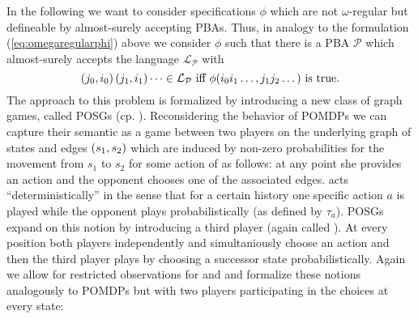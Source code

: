 In the following we want to consider specifications $\phi$ which are not 
$\omega$-regular but defineable by almost-surely accepting \acp{PBA}. Thus, in
analogy to the formulation (\ref{eq:omegaregularphi}) above we consider $\phi$ 
such that there is a \ac{PBA} $\mathcal{P}$ which almost-surely accepts the 
language $\mathcal{L}_{\mathcal{P}}$ with
\begin{equation}
  \left(j_{0}, i_{0}\right)\left(j_{1}, i_{1}\right)\dots\in\mathcal{L}_{\mathcal{P}}
  \text{ iff }
  \phi(i_{0}i_{1}\dots, j_{1}j_{2}\dots)\text{ is true.}
  \label{eq:pbaregularphi}
\end{equation}
The approach to this problem is formalized by introducing a new class of graph
games, called \acp{POSG} (cp. \cite{POSG, PureStratPOSG}). Reconsidering the 
behavior of \acp{POMDP} we can capture their semantic as a game between two 
players on the underlying graph of states and edges $\left(s_{1}, s_{2}\right)$ 
which are induced by non-zero probabilities for the movement from $s_{1}$ to 
$s_{2}$ for some action of \eve{} as follows: at any point she provides an 
action and the opponent chooses one of the associated edges. \eve{}
acts \enquote{deterministically} in the sense that for a certain history 
one specific action $a$ is played while the opponent plays probabilistically 
(as defined by $\tau_{a}$). \acp{POSG} expand on this notion by introducing a 
third player (again called \adam{}). At every position both players 
independently and simultaniously choose an action and then the third player 
plays by choosing a successor state probabilistically. Again we allow for 
restricted observations for \eve{} and \adam{} and formalize these notions 
analogously to \acp{POMDP} but with two players 
participating in the choices at every state:

